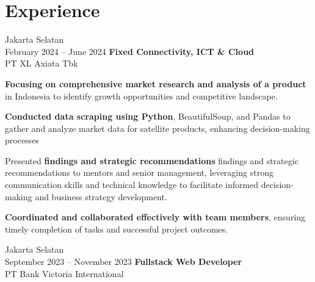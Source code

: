 \documentclass[../main.tex]{subfiles}
\begin{document}
    \section{Experience}
        \begin{twocolentry}{
            Jakarta Selatan \\
            February 2024 – June 2024}
      \textbf{Fixed Connectivity, ICT \& Cloud}\\
            PT XL Axiata Tbk
        \end{twocolentry}

        \vspace{0.10 cm}
        \begin{onecolentry}
            \begin{highlights}
            \item \textbf{Focusing on comprehensive market research and analysis of a product} in Indonesia to identify growth opportunities and competitive landscape.
            \item \textbf{Conducted data scraping using Python}, BeautifulSoup, and Pandas to gather and analyze market data for satellite products, enhancing decision-making processes
            \item Presented \textbf{findings and strategic recommendations} findings and strategic recommendations to mentors and senior management, leveraging strong communication skills and technical knowledge to facilitate informed decision-making and business strategy development.
            \item \textbf{Coordinated and collaborated effectively with team members}, ensuring timely completion of tasks and successful project outcomes.
            \end{highlights}
        \end{onecolentry}


        \vspace{0.2 cm}

        \begin{twocolentry}{
        Jakarta Selatan \\
          September 2023 – November 2023}
            \textbf{Fullstack Web Developer}\\
            PT Bank Victoria International
        \end{twocolentry}
\end{document}
